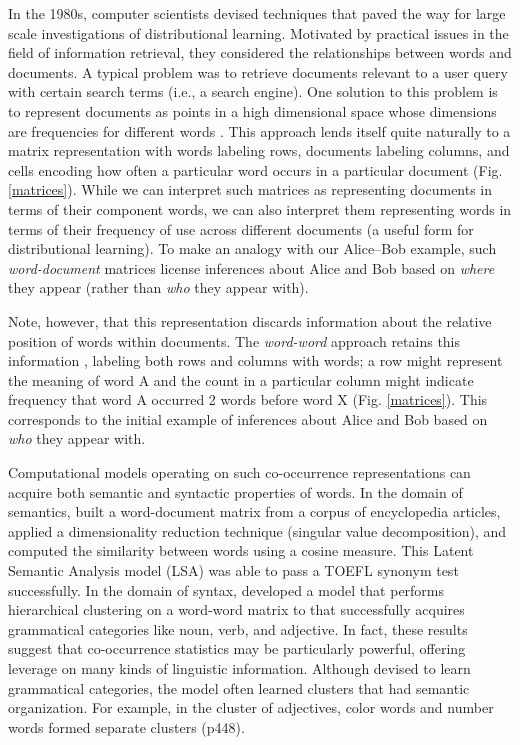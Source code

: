 \documentclass[man,longtable, floatmark]{my-apa6}
\begin{document}
In the 1980s, computer scientists devised techniques that paved the way for large scale investigations of distributional learning. Motivated by practical issues in the field of information retrieval, they considered the relationships between words and documents. A typical problem was to retrieve documents relevant to a user query with certain search terms (i.e., a search engine). One solution to this problem is to represent documents as points in a high dimensional space whose dimensions are frequencies for different words \citep{salton1983}. This approach lends itself quite naturally to a matrix representation with words labeling rows, documents labeling columns, and cells encoding how often a particular word occurs in a particular document (Fig. \ref{matrices}). While we can interpret such matrices as representing documents in terms of their component words, we can also interpret them representing words in terms of their frequency of use across different documents (a useful form for distributional learning). To make an analogy with our Alice--Bob example, such \emph{word-document} matrices license inferences about Alice and Bob based on \emph{where} they appear (rather than \emph{who} they appear with).

Note, however, that this representation discards information about the relative position of words within documents. The \emph{word-word} approach retains this information \citep{church1990, schutze1992}, labeling both rows and columns with words; a row might represent the meaning of word A and the count in a particular column might indicate frequency that word A occurred 2 words before word X (Fig. \ref{matrices}). This corresponds to the initial example of inferences about Alice and Bob based on \emph{who} they appear with.

Computational models operating on such co-occurrence representations can acquire both semantic and syntactic properties of words. In the domain of semantics, \citet{landauer1997} built a word-document matrix from a corpus of encyclopedia articles, applied a dimensionality reduction technique (singular value decomposition), and computed the similarity between words using a cosine measure. This Latent Semantic Analysis model (LSA) was able to pass a TOEFL synonym test successfully. In the domain of syntax, \citet{redington1998} developed a model that performs hierarchical clustering on a word-word matrix to that successfully acquires grammatical categories like noun, verb, and adjective. In fact, these results suggest that co-occurrence statistics may be particularly powerful, offering leverage on many kinds of linguistic information. Although devised to learn grammatical categories, the model often learned clusters that had semantic organization. For example, in the cluster of adjectives, color words and number words formed separate clusters (p448).
\end{document}
